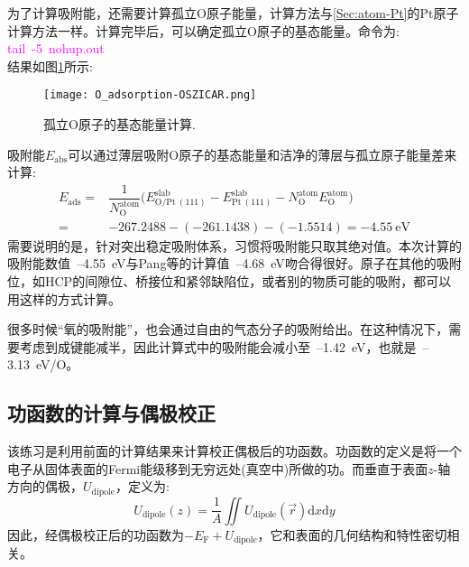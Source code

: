 为了计算吸附能，还需要计算孤立\textrm{O}原子能量，计算方法与\ref{Sec:atom-Pt}的\textrm{Pt}原子计算方法一样。计算完毕后，可以确定孤立\textrm{O}原子的基态能量。命令为:~\\
\textcolor{magenta}{\textrm{tail~-5~nohup.out}}\\
结果如图\ref{O_adsorption-OSZICAR}所示:
\begin{figure}[h!]
\centering
\vskip -10pt
\texttt{[image: O\_adsorption-OSZICAR.png]}
\caption{\small \textrm{孤立\textrm{O}原子的基态能量计算}.}%
\label{O_adsorption-OSZICAR}
\end{figure}

吸附能$E_{\mathrm{abs}}$可以通过薄层吸附\textrm{O}原子的基态能量和洁净的薄层与孤立原子能量差来计算:~
\begin{displaymath}
	\begin{aligned}
		E_{\mathrm{ads}}=&\dfrac1{N_{\mathrm{O}}^{\mathrm{atom}}}\big(E_{\mathrm{O/Pt~(111)}}^{\mathrm{slab}}-E_{\mathrm{Pt~(111)}}^{\mathrm{slab}}-N_{\mathrm{O}}^{\mathrm{atom}}E_{\mathrm{O}}^{\mathrm{atom}}\big)\\
		=&-267.2488-(-261.1438)-(-1.5514)=-4.55\mathrm{~eV}
	\end{aligned}
\end{displaymath}
需要说明的是，针对突出稳定吸附体系，习惯将吸附能只取其绝对值。本次计算的吸附能数值~--4.55\textrm{~eV}与\textrm{Pang}等的计算值~--4.68\textrm{~eV}\cite{ASS257-3047_2011}吻合得很好。原子在其他的吸附位，如\textrm{HCP}的间隙位、桥接位和紧邻缺陷位，或者别的物质可能的吸附，都可以用这样的方式计算。

很多时候“氧的吸附能”，也会通过自由的气态分子的吸附给出。在这种情况下，需要考虑到成键能减半，因此计算式中的吸附能会减小至~--1.42\textrm{~eV}，也就是~--3.13\textrm{~eV/O}\cite{Eectrochim52-2219_2007}。

\subsection{功函数的计算与偶极校正}
该练习是利用前面的计算结果来计算校正偶极后的功函数。功函数的定义是将一个电子从固体表面的\textrm{Fermi}能级移到无穷远处(真空中)所做的功。而垂直于表面$z$-轴方向的偶极，$U_{\mathrm{dipole}}$，定义为:~
\begin{displaymath}
	U_{\mathrm{dipole}}(z)=\dfrac1A\iint U_{\mathrm{dipole}}(\vec r)\mathrm{d}x\mathrm{d}y
\end{displaymath}
因此，经偶极校正后的功函数为$-E_{\mathrm{F}}+U_{\mathrm{dipole}}$，它和表面的几何结构和特性密切相关。
